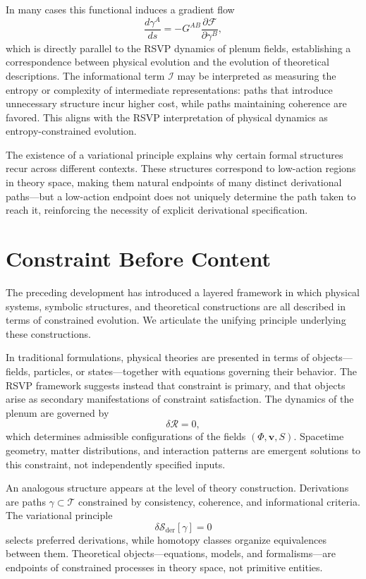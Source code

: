 \documentclass[12pt,a4paper]{article}
\theoremstyle{plain}
\theoremstyle{definition}
\theoremstyle{remark}
\begin{document}
In many cases this functional induces a gradient flow
\begin{equation}
\frac{d\gamma^A}{ds} = -G^{AB}\frac{\partial\mathcal{F}}{\partial\gamma^B},
\end{equation}
which is directly parallel to the RSVP dynamics of plenum fields,
establishing a correspondence between physical evolution and the
evolution of theoretical descriptions. The informational term
$\mathcal{I}$ may be interpreted as measuring the entropy or complexity
of intermediate representations: paths that introduce unnecessary
structure incur higher cost, while paths maintaining coherence are
favored. This aligns with the RSVP interpretation of physical dynamics
as entropy-constrained evolution.

The existence of a variational principle explains why certain formal
structures recur across different contexts. These structures correspond
to low-action regions in theory space, making them natural endpoints of
many distinct derivational paths---but a low-action endpoint does not
uniquely determine the path taken to reach it, reinforcing the
necessity of explicit derivational specification.

\section{Constraint Before Content}
\label{sec:constraintcontent}

The preceding development has introduced a layered framework in which
physical systems, symbolic structures, and theoretical constructions
are all described in terms of constrained evolution. We articulate the
unifying principle underlying these constructions.

In traditional formulations, physical theories are presented in terms
of objects---fields, particles, or states---together with equations
governing their behavior. The RSVP framework suggests instead that
constraint is primary, and that objects arise as secondary
manifestations of constraint satisfaction. The dynamics of the plenum
are governed by
\begin{equation}
\delta\mathcal{R} = 0,
\end{equation}
which determines admissible configurations of the fields
$(\Phi,\mathbf{v},S)$. Spacetime geometry, matter distributions, and
interaction patterns are emergent solutions to this constraint, not
independently specified inputs.

An analogous structure appears at the level of theory construction.
Derivations are paths $\gamma \subset \mathcal{T}$ constrained by
consistency, coherence, and informational criteria. The variational
principle
\begin{equation}
\delta\mathcal{S}_{\mathrm{der}}[\gamma] = 0
\end{equation}
selects preferred derivations, while homotopy classes organize
equivalences between them. Theoretical objects---equations, models,
and formalisms---are endpoints of constrained processes in theory
space, not primitive entities.
\end{document}
